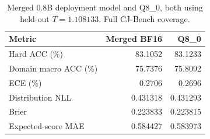 \begin{table}[t]
\centering
\footnotesize
\setlength{\tabcolsep}{4pt}
\caption{Merged 0.8B deployment model and Q8\_0, both using held-out $T=1.108133$. Full CJ-Bench coverage.}
\label{tab:deployment}
\begin{tabular}{lrr}
\toprule
Metric & Merged BF16 & Q8\_0 \\
\midrule
Hard ACC (\%) & 83.1052 & 83.1233 \\
Domain macro ACC (\%) & 75.7376 & 75.8092 \\
ECE (\%) & 0.2706 & 0.2696 \\
Distribution NLL & 0.431318 & 0.431293 \\
Brier & 0.223833 & 0.223815 \\
Expected-score MAE & 0.584427 & 0.583973 \\
\bottomrule
\end{tabular}
\end{table}
